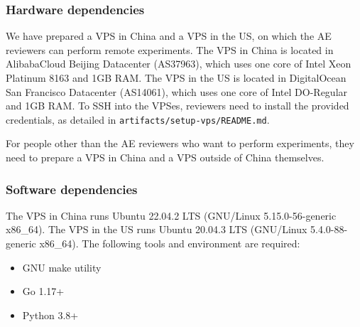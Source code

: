 \subsubsection{Hardware dependencies}

We have prepared a VPS in China and a VPS in the US,
on which the AE reviewers can perform remote experiments.
%
The VPS in China is located in AlibabaCloud Beijing Datacenter (AS37963),
which uses one core of Intel Xeon Platinum 8163 and 1GB RAM.
The VPS in the US is located in DigitalOcean San Francisco Datacenter (AS14061),
which uses one core of Intel DO-Regular and 1GB RAM.
To SSH into the VPSes, reviewers need to install the provided credentials,
as detailed in \texttt{artifacts/setup-vps/README.md}.

For people other than the AE reviewers who want to perform experiments,
they need to prepare a VPS in China and a VPS outside of China themselves.


\subsubsection{Software dependencies}

The VPS in China runs Ubuntu 22.04.2 LTS (GNU/Linux 5.15.0-56-generic x86\_64).
The VPS in the US runs Ubuntu 20.04.3 LTS (GNU/Linux 5.4.0-88-generic x86\_64).
The following tools and environment are required:

\begin{itemize}
    \item GNU make utility
    \item Go 1.17+
    \item Python 3.8+
\end{itemize}

